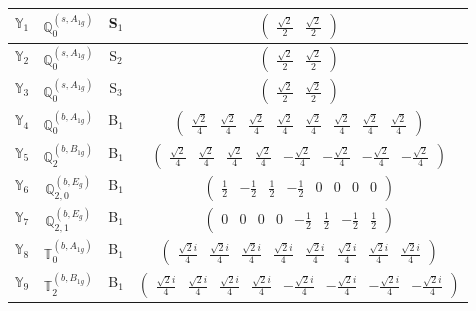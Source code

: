 \documentclass[fleqn,10pt,landscape]{article}
\begin{document}
\begin{itemize}
\begin{center}
\begin{longtable}{c|c|c|c}
$ \mathbb{Y}_{1} $ & $\mathbb{Q}_{0}^{(s,A_{1g})}$ & S$_{1}$ & $\begin{pmatrix} \frac{\sqrt{2}}{2} & \frac{\sqrt{2}}{2} \end{pmatrix}$ \\ \hline
$ \mathbb{Y}_{2} $ & $\mathbb{Q}_{0}^{(s,A_{1g})}$ & S$_{2}$ & $\begin{pmatrix} \frac{\sqrt{2}}{2} & \frac{\sqrt{2}}{2} \end{pmatrix}$ \\ \hline
$ \mathbb{Y}_{3} $ & $\mathbb{Q}_{0}^{(s,A_{1g})}$ & S$_{3}$ & $\begin{pmatrix} \frac{\sqrt{2}}{2} & \frac{\sqrt{2}}{2} \end{pmatrix}$ \\ \hline
$ \mathbb{Y}_{4} $ & $\mathbb{Q}_{0}^{(b,A_{1g})}$ & B$_{1}$ & $\begin{pmatrix} \frac{\sqrt{2}}{4} & \frac{\sqrt{2}}{4} & \frac{\sqrt{2}}{4} & \frac{\sqrt{2}}{4} & \frac{\sqrt{2}}{4} & \frac{\sqrt{2}}{4} & \frac{\sqrt{2}}{4} & \frac{\sqrt{2}}{4} \end{pmatrix}$ \\
$ \mathbb{Y}_{5} $ & $\mathbb{Q}_{2}^{(b,B_{1g})}$ & B$_{1}$ & $\begin{pmatrix} \frac{\sqrt{2}}{4} & \frac{\sqrt{2}}{4} & \frac{\sqrt{2}}{4} & \frac{\sqrt{2}}{4} & - \frac{\sqrt{2}}{4} & - \frac{\sqrt{2}}{4} & - \frac{\sqrt{2}}{4} & - \frac{\sqrt{2}}{4} \end{pmatrix}$ \\
$ \mathbb{Y}_{6} $ & $\mathbb{Q}_{2,0}^{(b,E_{g})}$ & B$_{1}$ & $\begin{pmatrix} \frac{1}{2} & - \frac{1}{2} & \frac{1}{2} & - \frac{1}{2} & 0 & 0 & 0 & 0 \end{pmatrix}$ \\
$ \mathbb{Y}_{7} $ & $\mathbb{Q}_{2,1}^{(b,E_{g})}$ & B$_{1}$ & $\begin{pmatrix} 0 & 0 & 0 & 0 & - \frac{1}{2} & \frac{1}{2} & - \frac{1}{2} & \frac{1}{2} \end{pmatrix}$ \\
$ \mathbb{Y}_{8} $ & $\mathbb{T}_{0}^{(b,A_{1g})}$ & B$_{1}$ & $\begin{pmatrix} \frac{\sqrt{2} i}{4} & \frac{\sqrt{2} i}{4} & \frac{\sqrt{2} i}{4} & \frac{\sqrt{2} i}{4} & \frac{\sqrt{2} i}{4} & \frac{\sqrt{2} i}{4} & \frac{\sqrt{2} i}{4} & \frac{\sqrt{2} i}{4} \end{pmatrix}$ \\
$ \mathbb{Y}_{9} $ & $\mathbb{T}_{2}^{(b,B_{1g})}$ & B$_{1}$ & $\begin{pmatrix} \frac{\sqrt{2} i}{4} & \frac{\sqrt{2} i}{4} & \frac{\sqrt{2} i}{4} & \frac{\sqrt{2} i}{4} & - \frac{\sqrt{2} i}{4} & - \frac{\sqrt{2} i}{4} & - \frac{\sqrt{2} i}{4} & - \frac{\sqrt{2} i}{4} \end{pmatrix}$ \\

\end{longtable}
\end{center}
\end{itemize}
\end{document}
